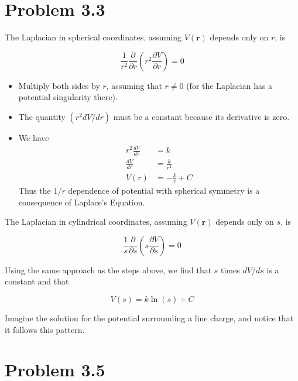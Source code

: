\documentclass[10pt]{article}
\begin{document}
\maketitle

\section{Problem 3.3}

The Laplacian in spherical coordinates, assuming $V(\mathbf{r})$ depends only on $r$, is

\begin{equation}
\frac{1}{r^2}\frac{\partial}{\partial r}\left( r^2 \frac{\partial V}{\partial r}\right) = 0
\end{equation}

\begin{itemize}
\item Multiply both sides by $r$, assuming that $r \neq 0$ (for the Laplacian has a potential singularity there).
\item The quantity $(r^2 dV/dr)$ must be a constant because its derivative is zero.
\item We have
\begin{align}
r^2 \frac{dV}{dr} &= k \\
\frac{dV}{dr} &= \frac{k}{r^2} \\
V(r) &= - \frac{k}{r} + C
\end{align}
Thus the $1/r$ dependence of potential with spherical symmetry is a consequence of Laplace's Equation.  
\end{itemize}

The Laplacian in cylindrical coordinates, assuming $V(\mathbf{r})$ depends only on $s$, is

\begin{equation}
\frac{1}{s}\frac{\partial}{\partial s}\left( s \frac{\partial V}{\partial s}\right) = 0
\end{equation}

Using the same approach as the steps above, we find that $s$ times $dV/ds$ is a constant and that 

\begin{equation}
V(s) = k\ln(s) + C
\end{equation}

Imagine the solution for the potential surrounding a line charge, and notice that it follows this pattern.

\section{Problem 3.5}
\end{document}
